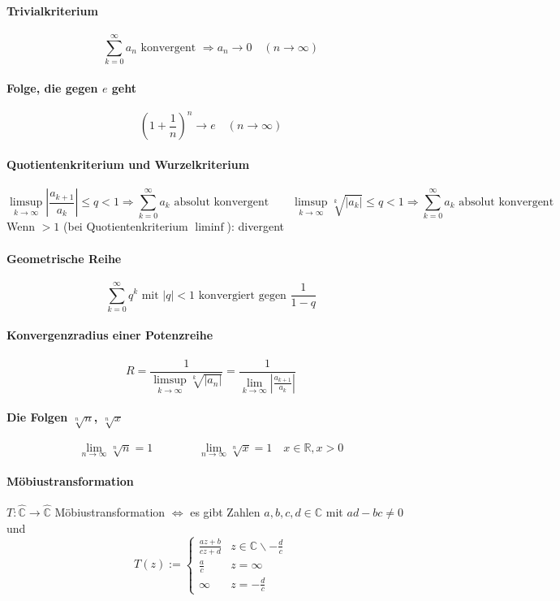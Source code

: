 \documentclass[a4paper, 10pt, DIV20, headings=small]{scrartcl}
\theoremstyle{definition}
\theoremstyle{plain}
\begin{document}
\paragraph{Trivialkriterium}
$$\sum\limits_{k=0}^{\infty}a_n \text{ konvergent } \Rightarrow a_n \rightarrow 0 \quad (n \rightarrow \infty)$$

\paragraph{Folge, die gegen $e$ geht}
$$\left(1+\frac{1}{n}\right)^n \rightarrow e \quad (n \rightarrow \infty)$$

\paragraph{Quotientenkriterium und Wurzelkriterium}
$$\limsup\limits_{k \rightarrow \infty} \left|\frac{a_{k+1}}{a_k}\right| \leq q < 1 \Rightarrow \sum\limits_{k=0}^\infty a_k \text{ absolut konvergent} \qquad \limsup\limits_{k \rightarrow \infty} \sqrt[k]{|a_k|} \leq q < 1 \Rightarrow \sum\limits_{k=0}^\infty a_k \text{ absolut konvergent}$$
Wenn $> 1$ (bei Quotientenkriterium $\liminf$): divergent

\paragraph{Geometrische Reihe}
$$\sum\limits_{k=0}^\infty q^k \text{ mit } |q| < 1 \text{ konvergiert gegen } \frac{1}{1-q}$$

\paragraph{Konvergenzradius einer Potenzreihe}
$$R = \frac{1}{\limsup\limits_{k\rightarrow \infty} \sqrt[k]{|a_n|}} = \frac{1}{\lim\limits_{k\rightarrow \infty}{|\frac{a_{k+1}}{a_k}|}}$$

\paragraph{Die Folgen $\sqrt[n]{n}$, $\sqrt[n]{x}$}
$$\lim_{n \rightarrow \infty} \sqrt[n]{n} = 1 \qquad \qquad \lim_{n \rightarrow \infty} \sqrt[n]{x} = 1 \quad x \in \mathbb{R}, x > 0$$

\paragraph{Möbiustransformation}
$T \colon \hat{\mathbb{C}} \rightarrow \hat{\mathbb{C}}$ Möbiustransformation $\Leftrightarrow$
es gibt Zahlen $a,b,c,d \in \mathbb{C}$ mit $ad-bc \neq 0$ und
$$T(z) := \begin{cases} \frac{az+b}{cz+d} & z \in \mathbb{C} \backslash -\frac{d}{c} \\
\frac{a}{c} & z = \infty \\
\infty & z = - \frac{d}{c} \end{cases}$$
\end{document}

